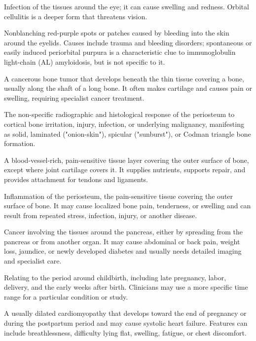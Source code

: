  Infection of the tissues around the eye; it can cause swelling and redness. Orbital cellulitis is a deeper form that threatens vision.

 Nonblanching red-purple spots or patches caused by bleeding into the skin around the eyelids. Causes include trauma and bleeding disorders; spontaneous or easily induced periorbital purpura is a characteristic clue to immunoglobulin light-chain (AL) amyloidosis, but is not specific to it.

 A cancerous bone tumor that develops beneath the thin tissue covering a bone, usually along the shaft of a long bone. It often makes cartilage and causes pain or swelling, requiring specialist cancer treatment.

 The non-specific radiographic and histological response of the periosteum to cortical bone irritation, injury, infection, or underlying malignancy, manifesting as solid, laminated ("onion-skin"), spicular ("sunburst"), or Codman triangle bone formation.

 A blood-vessel-rich, pain-sensitive tissue layer covering the outer surface of bone, except where joint cartilage covers it. It supplies nutrients, supports repair, and provides attachment for tendons and ligaments.

 Inflammation of the periosteum, the pain-sensitive tissue covering the outer surface of bone. It may cause localized bone pain, tenderness, or swelling and can result from repeated stress, infection, injury, or another disease.

 Cancer involving the tissues around the pancreas, either by spreading from the pancreas or from another organ. It may cause abdominal or back pain, weight loss, jaundice, or newly developed diabetes and usually needs detailed imaging and specialist care.

 Relating to the period around childbirth, including late pregnancy, labor, delivery, and the early weeks after birth. Clinicians may use a more specific time range for a particular condition or study.

 A usually dilated cardiomyopathy that develops toward the end of pregnancy or during the postpartum period and may cause systolic heart failure. Features can include breathlessness, difficulty lying flat, swelling, fatigue, or chest discomfort.

